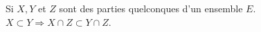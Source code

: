 %
%
	Si $X, Y$ et $Z$ sont des parties quelconques d'un ensemble $E$.
	\Mq $X \subset Y \Rightarrow X\cap Z \subset Y \cap Z$.
